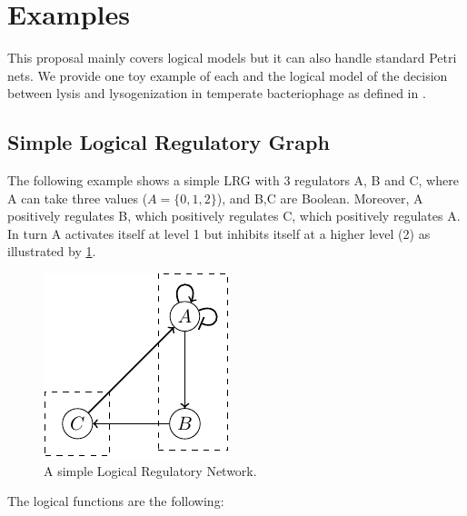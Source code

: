
\section{Examples}
\label{examples}


This proposal mainly covers logical models but it can also handle standard Petri nets. We provide one toy example of each and the logical model of the decision between lysis and lysogenization in temperate bacteriophage as defined in \cite{thieffry95}.

\subsection{Simple Logical Regulatory Graph} %
\label{sub:lrg}
The following example shows a simple LRG with 3 regulators A, B and C, where A can take three values ($A=\{0,1,2\}$), and B,C are Boolean. Moreover, A positively regulates B, which positively regulates C, which positively regulates A. In turn A activates itself at level 1 but inhibits itself at a higher level (2) as illustrated by \ref{ex-lrg}.

\begin{figure}[hb]
  \includegraphics{figs/LRG.pdf}
  \caption{A simple Logical Regulatory Network.}
  \label{ex-lrg}
\end{figure}


The logical functions are the following:

\smallskip


